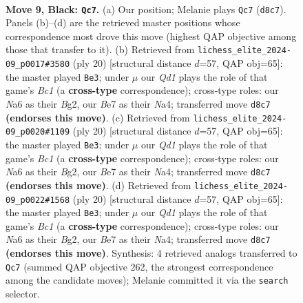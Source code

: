 \documentclass[11pt]{article}
\begin{document}
\clearpage

\begin{figure}[p]\centering
\begin{subfigure}{0.46\textwidth}\centering
\resizebox{\linewidth}{!}{%
\newchessgame
\chessboard[
  setfen={r1bq1rk1/pp2bppp/n1p1pn2/8/2NP4/5PP1/PP2P1BP/RNBQ1RK1 b - - 0 9},
  showmover=false,
  pgfstyle=straightmove, color=movearrow, markmove={d8-c7}
]}
\caption{}
\end{subfigure}\hfill
\begin{subfigure}{0.46\textwidth}\centering
\resizebox{\linewidth}{!}{%
\newchessgame
\chessboard[
  setfen={rnbq1rk1/pp2bpp1/5n1p/3p4/N7/5NP1/PP2PPBP/R1BQ1RK1 w - - 2 11},
  showmover=false,
  pgfstyle=straightmove, color=movearrow, markmove={c1-e3}
]}
\caption{}
\end{subfigure}
\\[4pt]
\begin{subfigure}{0.46\textwidth}\centering
\resizebox{\linewidth}{!}{%
\newchessgame
\chessboard[
  setfen={rnbq1rk1/pp2bpp1/5n1p/3p4/N7/5NP1/PP2PPBP/R1BQ1RK1 w - - 2 11},
  showmover=false,
  pgfstyle=straightmove, color=movearrow, markmove={c1-e3}
]}
\caption{}
\end{subfigure}\hfill
\begin{subfigure}{0.46\textwidth}\centering
\resizebox{\linewidth}{!}{%
\newchessgame
\chessboard[
  setfen={rnbq1rk1/pp2bpp1/5n1p/3p4/N7/5NP1/PP2PPBP/R1BQ1RK1 w - - 2 11},
  showmover=false,
  pgfstyle=straightmove, color=movearrow, markmove={c1-e3}
]}
\caption{}
\end{subfigure}
\caption{\textbf{Move 9, Black: \texttt{Qc7}.} (a) Our position; Melanie plays \texttt{Qc7} (\texttt{d8c7}). Panels (b)--(d) are the retrieved master positions whose correspondence most drove this move (highest QAP objective among those that transfer to it). (b) Retrieved from \texttt{lichess\_elite\_2024-09\_p0017\#3580} (ply 20) [structural distance $d$=57, QAP obj=65]: the master played \texttt{Be3}; under $\mu$ our \emph{Qd1} plays the role of that game's \emph{Bc1} (a \textbf{cross-type} correspondence); cross-type roles: our \emph{N}a6 as their \emph{B}g2, our \emph{B}e7 as their \emph{N}a4; transferred move \texttt{d8c7} \textbf{(endorses this move)}. (c) Retrieved from \texttt{lichess\_elite\_2024-09\_p0020\#1109} (ply 20) [structural distance $d$=57, QAP obj=65]: the master played \texttt{Be3}; under $\mu$ our \emph{Qd1} plays the role of that game's \emph{Bc1} (a \textbf{cross-type} correspondence); cross-type roles: our \emph{N}a6 as their \emph{B}g2, our \emph{B}e7 as their \emph{N}a4; transferred move \texttt{d8c7} \textbf{(endorses this move)}. (d) Retrieved from \texttt{lichess\_elite\_2024-09\_p0022\#1568} (ply 20) [structural distance $d$=57, QAP obj=65]: the master played \texttt{Be3}; under $\mu$ our \emph{Qd1} plays the role of that game's \emph{Bc1} (a \textbf{cross-type} correspondence); cross-type roles: our \emph{N}a6 as their \emph{B}g2, our \emph{B}e7 as their \emph{N}a4; transferred move \texttt{d8c7} \textbf{(endorses this move)}. Synthesis: 4 retrieved analogs transferred to \texttt{Qc7} (summed QAP objective 262, the strongest correspondence among the candidate moves); Melanie committed it via the \texttt{search} selector.}

\end{figure}
\end{document}
